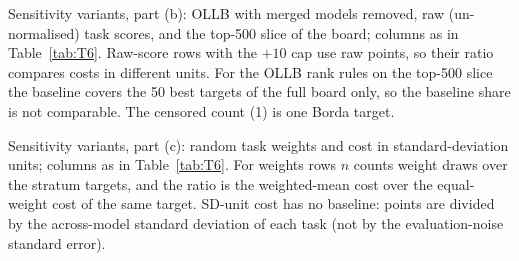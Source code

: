 \documentclass{article}
\begin{document}
\begin{table}[h]
\caption{Sensitivity variants, part (b): OLLB with merged models removed, raw (un-normalised) task scores, and the top-500 slice of the board; columns as in Table~\ref{tab:T6}. Raw-score rows with the $+10$ cap use raw points, so their ratio compares costs in different units. For the OLLB rank rules on the top-500 slice the baseline covers the 50 best targets of the full board only, so the baseline share is not comparable. The censored count (1) is one Borda target.}
\label{tab:T6b}
\centering\scriptsize
\resizebox{\linewidth}{!}{}
\end{table}

\begin{table}[h]
\caption{Sensitivity variants, part (c): random task weights and cost in standard-deviation units; columns as in Table~\ref{tab:T6}. For weights rows $n$ counts weight draws over the stratum targets, and the ratio is the weighted-mean cost over the equal-weight cost of the same target. SD-unit cost has no baseline: points are divided by the across-model standard deviation of each task (not by the evaluation-noise standard error).}
\label{tab:T6c}
\centering\scriptsize
\resizebox{\linewidth}{!}{}
\end{table}
\end{document}
